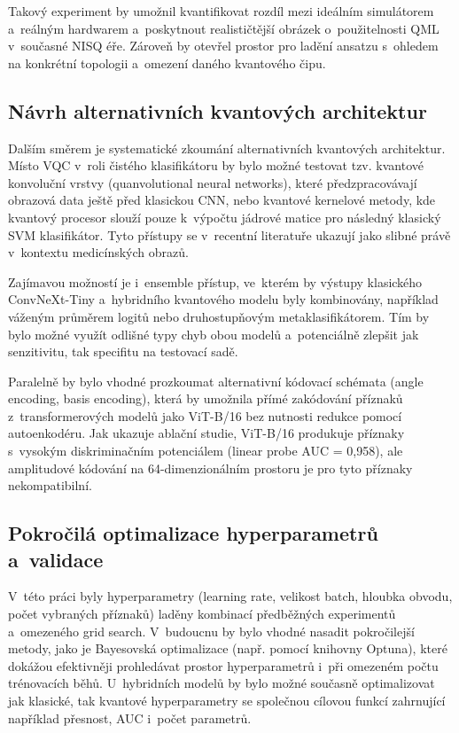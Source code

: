 \documentclass[12pt, a4paper]{report}
\begin{document}
Takový experiment by umožnil kvantifikovat rozdíl mezi ideálním simulátorem a~reálným hardwarem a~poskytnout realističtější obrázek o~použitelnosti QML v~současné NISQ éře. Zároveň by otevřel prostor pro ladění ansatzu s~ohledem na konkrétní topologii a~omezení daného kvantového čipu.

\subsection{Návrh alternativních kvantových architektur}

Dalším směrem je systematické zkoumání alternativních kvantových architektur. Místo VQC v~roli čistého klasifikátoru by bylo možné testovat tzv. kvantové konvoluční vrstvy (quanvolutional neural networks), které předzpracovávají obrazová data ještě před klasickou CNN, nebo kvantové kernelové metody, kde kvantový procesor slouží pouze k~výpočtu jádrové matice pro následný klasický SVM klasifikátor. Tyto přístupy se v~recentní literatuře ukazují jako slibné právě v~kontextu medicínských obrazů.

Zajímavou možností je i~ensemble přístup, ve~kterém by výstupy klasického ConvNeXt-Tiny a~hybridního kvantového modelu byly kombinovány, například váženým průměrem logitů nebo druhostupňovým metaklasifikátorem. Tím by bylo možné využít odlišné typy chyb obou modelů a~potenciálně zlepšit jak senzitivitu, tak specifitu na testovací sadě.

Paralelně by bylo vhodné prozkoumat alternativní kódovací schémata (angle encoding, basis encoding), která by umožnila přímé zakódování příznaků z~transformerových modelů jako ViT-B/16 bez nutnosti redukce pomocí autoenkodéru. Jak ukazuje ablační studie, ViT-B/16 produkuje příznaky s~vysokým diskriminačním potenciálem (linear probe AUC = 0{,}958), ale amplitudové kódování na 64-dimenzionálním prostoru je pro tyto příznaky nekompatibilní.

\subsection{Pokročilá optimalizace hyperparametrů a~validace}

V~této práci byly hyperparametry (learning rate, velikost batch, hloubka obvodu, počet vybraných příznaků) laděny kombinací předběžných experimentů a~omezeného grid search. V~budoucnu by bylo vhodné nasadit pokročilejší metody, jako je Bayesovská optimalizace (např. pomocí knihovny Optuna), které dokážou efektivněji prohledávat prostor hyperparametrů i~při omezeném počtu trénovacích běhů. U~hybridních modelů by bylo možné současně optimalizovat jak klasické, tak kvantové hyperparametry se společnou cílovou funkcí zahrnující například přesnost, AUC i~počet parametrů.
\end{document}
